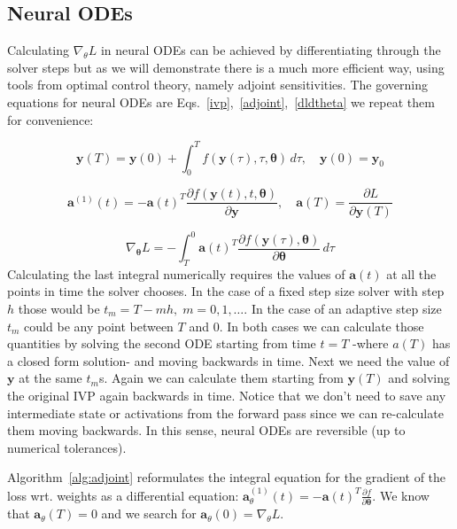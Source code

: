 \documentclass[11pt]{report}
\begin{document}
    \subsection{Neural ODEs}
    Calculating $\nabla_{\theta}L$ in neural ODEs can be achieved by differentiating through the solver steps but as we will demonstrate there is a much more efficient way, using tools from optimal control theory, namely adjoint sensitivities.
    The governing equations for neural ODEs are Eqs.~\eqref{ivp},~\eqref{adjoint},~\eqref{dldtheta} we repeat them for convenience:

    \begin{equation*}
        \pmb{y}(T) =  \pmb{y}(0) +\int_{0}^{T} f(\pmb{y}(\tau), \tau, \pmb{\theta}) \,d\tau
        , \quad
        \pmb{y}(0) = \pmb{y}_0
    \end{equation*}

    \begin{equation*}
        \pmb{a}^{(1)}(t)
        =
        - \pmb{a}(t)^T
        \frac
        {\partial f( \pmb{y}(t), t, \pmb{\theta} )}
        {\partial \pmb{y} }
        , \quad
        \pmb{a}(T) = \frac{\partial L}{\partial \pmb{y}(T)}
    \end{equation*}

    \begin{equation*}
        \nabla_{\pmb{\theta}} L =
        - \int_T^0
        \pmb{a}(t)^T
        \frac
        {\partial f(\pmb{y}(\tau), \pmb{\theta})}
        {\partial \pmb{\theta}}
        \, d\tau
    \end{equation*}
    Calculating the last integral numerically requires the values of $\pmb{a}(t)$ at all the points in time the solver chooses.
    In the case of a fixed step size solver with step $h$ those would be $t_m = T - mh, \; m=0,1,\dots$.
    In the case of an adaptive step size $t_m$ could be any point between $T$ and $0$.
    In both cases we can calculate those quantities by solving the second ODE starting from time $t=T$ -where $a(T)$ has a closed form solution- and moving backwards in time.
    Next we need the value of $\pmb{y}$ at the same $t_m$s. Again we can calculate them starting from $\pmb{y}(T)$ and solving the original IVP again backwards in time.
    Notice that we don't need to save any intermediate state or activations from the forward pass since we can re-calculate them moving backwards.
    In this sense, neural ODEs are reversible (up to numerical tolerances).

    Algorithm~\ref{alg:adjoint} reformulates the integral equation for the gradient of the loss wrt.
    weights as a differential equation: $ \pmb{a}^{(1)}_\theta(t) = -\pmb{a}(t)^T \frac{\partial f}{\partial \pmb{\theta}}$.
    We know that $\pmb{a}_\theta(T) = 0$ and we search for $\pmb{a}_\theta(0) = \nabla_\theta L$.
\end{document}
